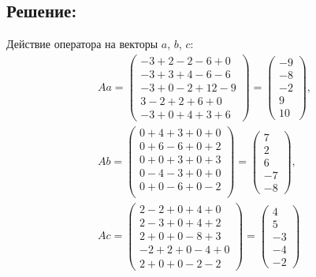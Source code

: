 \documentclass[12pt]{article}
\begin{document}
    \subsection*{Решение:}
    Действие оператора на векторы $a$, $b$, $c$:
    \begin{gather*}
        A a
        =
        \begin{pmatrix}
            -3 + 2 - 2 - 6 + 0 \\
            -3 + 3 + 4 - 6 - 6 \\
            -3 + 0 - 2 + 12 - 9 \\
            3 - 2 + 2 + 6 + 0 \\
            -3 + 0 + 4 + 3 + 6
        \end{pmatrix}
        =
        \begin{pmatrix}
            -9 \\
            -8 \\
            -2 \\
            9 \\
            10
        \end{pmatrix} , \\
        A b
        =
        \begin{pmatrix}
            0 + 4 + 3 + 0 + 0 \\
            0 + 6 - 6 + 0 + 2 \\
            0 + 0 + 3 + 0 + 3 \\
            0 - 4 - 3 + 0 + 0 \\
            0 + 0 - 6 + 0 - 2 \\
        \end{pmatrix}
        =
        \begin{pmatrix}
            7 \\
            2 \\
            6 \\
            -7 \\
            - 8
        \end{pmatrix} , \\
        A c
        =
        \begin{pmatrix}
            2 - 2 + 0 + 4 + 0 \\
            2 - 3 + 0 + 4 + 2 \\
            2 + 0 + 0 - 8 + 3 \\
            -2 + 2 + 0 - 4 + 0 \\
            2 + 0 + 0 - 2 - 2
        \end{pmatrix}
        =
        \begin{pmatrix}
            4 \\
            5 \\
            -3 \\
            -4 \\
            -2
        \end{pmatrix}
    \end{gather*}
\end{document}
